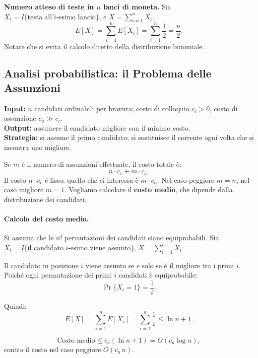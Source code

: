 \begin{esempio}
	\textbf{Numero atteso di teste in $n$ lanci di moneta.}
	Sia $X_i = I\{\text{testa all'$i$-esimo lancio}\}$,
	e $X = \sum_{i=1}^n X_i$.
	\[
	E[X] = \sum_{i=1}^n E[X_i] = \sum_{i=1}^n \frac{1}{2} = \frac{n}{2}.
	\]
	Notare che si evita il calcolo diretto della distribuzione binomiale.
\end{esempio}

\subsection{Analisi probabilistica: il Problema delle Assunzioni}

\begin{definizione}
	\textbf{Input:} $n$ candidati ordinabili per bravura;
	costo di colloquio $c_c > 0$, costo di assunzione $c_a \gg c_c$.\\
	\textbf{Output:} assumere il candidato migliore con il minimo costo.\\
	\textbf{Strategia:} si assume il primo candidato; si sostituisce
	il corrente ogni volta che si incontra uno migliore.
\end{definizione}

Se $m$ è il numero di assunzioni effettuate, il costo totale è:
\[
n \cdot c_c + m \cdot c_a.
\]
Il costo $n\cdot c_c$ è fisso; quello che ci interessa è $m\cdot c_a$.
Nel caso peggiore $m = n$, nel caso migliore $m = 1$.
Vogliamo calcolare il \textbf{costo medio}, che dipende dalla
distribuzione dei candidati.

\paragraph{Calcolo del costo medio.}
Si assuma che le $n!$ permutazioni dei candidati siano equiprobabili.
Sia $X_i = I\{\text{il candidato $i$-esimo viene assunto}\}$,
$X = \sum_{i=1}^n X_i$.

Il candidato in posizione $i$ viene assunto se e solo se è il
migliore tra i primi $i$. Poiché ogni permutazione dei primi $i$
candidati è equiprobabile:
\[
\Pr\{X_i = 1\} = \frac{1}{i}.
\]

Quindi:
\[
E[X] = \sum_{i=1}^{n} E[X_i] = \sum_{i=1}^{n} \frac{1}{i}
\le \ln n + 1.
\]

\begin{teorema}
	\[
	\text{Costo medio} \le c_a(\ln n + 1) = O(c_a \log n),
	\]
	contro il costo nel caso peggiore $O(c_a\, n)$.
\end{teorema}

